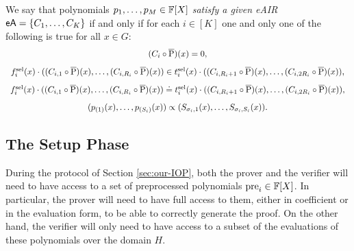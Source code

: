 \begin{definition}
  We say that polynomials $p_1,\dots,p_M \in \mathbb{F}[X]$ \textit{satisfy a given eAIR} $\textsf{eA} = \{C_1,\dots,C_K\}$ if and only if for each $i \in [K]$ one and only one of the following is true for all $x \in G$:
  \[
  \begin{array}{c}
    (C_i \circ \overline{\text{P}})(x) = 0, \\[0.3cm]
    f^{\text{sel}}_i(x) \cdot  ((C_{i,1} \circ \overline{\text{P}})(x),\dots,(C_{i,R_i} \circ \overline{\text{P}})(x)) \in t^{\text{sel}}_i(x) \cdot ((C_{i,R_i+1} \circ \overline{\text{P}})(x),\dots,(C_{i,2R_i} \circ \overline{\text{P}})(x)), \\[0.3cm]
    f^{\text{sel}}_i(x) \cdot  ((C_{i,1} \circ \overline{\text{P}})(x),\dots,(C_{i,R_i} \circ \overline{\text{P}})(x)) \doteq t^{\text{sel}}_i(x) \cdot ((C_{i,R_i+1} \circ \overline{\text{P}})(x),\dots,(C_{i,2R_i} \circ \overline{\text{P}})(x)), \\[0.3cm]
    (p_{(1)}(x),\dots,p_{(S_i)}(x)) \propto (S_{\sigma_i, 1}(x),\dots,S_{\sigma_i, S_i}(x)).
  \end{array}
  \]
\end{definition}

\subsection{The Setup Phase}\label{sec:preprocessing-phase}

During the protocol of Section \ref{sec:our-IOP}, both the prover and the verifier will need to have access to a set of preprocessed polynomials $\text{pre}_i \in \mathbb{F}[X]$. In particular, the prover will need to have full access to them, either in coefficient or in the evaluation form, to be able to correctly generate the proof. On the other hand, the verifier will only need to have access to a subset of the evaluations of these polynomials over the domain $H$.

